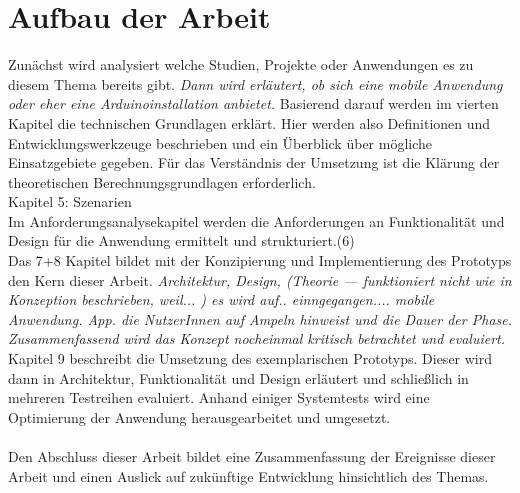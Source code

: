 \section{Aufbau der Arbeit}
Zunächst wird analysiert welche Studien, Projekte oder Anwendungen es zu diesem Thema bereits gibt.\textit{ Dann wird erläutert, ob sich eine mobile Anwendung oder eher eine \gls{Arduino}installation anbietet.} Basierend darauf werden im vierten Kapitel die technischen Grundlagen erklärt. Hier werden also Definitionen und Entwicklungswerkzeuge beschrieben und ein Überblick über mögliche Einsatzgebiete gegeben. Für das Verständnis der Umsetzung ist die Klärung der theoretischen Berechnungsgrundlagen erforderlich. \\
Kapitel 5: Szenarien \\
Im Anforderungsanalysekapitel werden die Anforderungen an Funktionalität und Design für die Anwendung ermittelt und strukturiert.(6) \\ 
Das 7+8 Kapitel bildet mit der Konzipierung und Implementierung des Prototyps den Kern dieser Arbeit. 
\textit{Architektur, Design, (Theorie --- funktioniert nicht wie in Konzeption beschrieben, weil... )
es wird auf.. einngegangen.... mobile Anwendung. \gls{App}. die NutzerInnen auf Ampeln hinweist und die Dauer der Phase. }
\textit{Zusammenfassend wird das Konzept nocheinmal kritisch betrachtet und evaluiert.}\\
Kapitel 9 beschreibt die Umsetzung des exemplarischen Prototyps. Dieser wird dann in Architektur, Funktionalität und Design erläutert und schließlich in mehreren Testreihen evaluiert. Anhand einiger Systemtests wird eine Optimierung der Anwendung herausgearbeitet und umgesetzt. 
\\\\Den Abschluss dieser Arbeit bildet eine Zusammenfassung der Ereignisse dieser Arbeit und einen Auslick auf zukünftige Entwicklung hinsichtlich des Themas.
